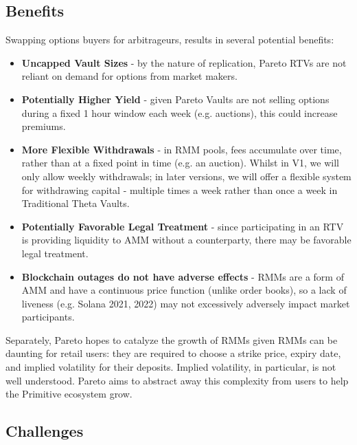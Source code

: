 \documentclass[hidelinks, 12pt]{article}
\begin{document}
\subsection{Benefits}

Swapping options buyers for arbitrageurs, results in several potential benefits:
\begin{itemize}
    \item \textbf{Uncapped Vault Sizes} - by the nature of replication, Pareto RTVs are not reliant on demand for options from market makers.
    \item \textbf{Potentially Higher Yield} - given Pareto Vaults are not selling options during a fixed 1 hour window each week (e.g. auctions), this could increase premiums.
    \item \textbf{More Flexible Withdrawals} - in RMM pools, fees accumulate over time, rather than at a fixed point in time (e.g. an auction). Whilst in V1, we will only allow weekly withdrawals; in later versions, we will offer a flexible system for withdrawing capital - multiple times a week rather than once a week in Traditional Theta Vaults.
    \item \textbf{Potentially Favorable Legal Treatment} - since participating in an RTV is providing liquidity to AMM without a counterparty, there may be favorable legal treatment.
    \item \textbf{Blockchain outages do not have adverse effects} - RMMs are a form of AMM and have a continuous price function (unlike order books), so  a lack of liveness (e.g. Solana 2021, 2022) may not excessively adversely impact market participants.
\end{itemize}
Separately, Pareto hopes to catalyze the growth of RMMs given RMMs can be daunting for retail users: they are required to choose a strike price, expiry date, and implied volatility for their deposits. Implied volatility, in particular, is not well understood. Pareto aims to abstract away this complexity from users to help the Primitive ecosystem grow. 

\subsection{Challenges}
\label{Challenges}
\end{document}
